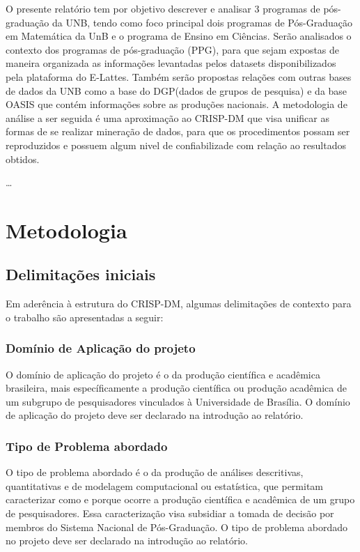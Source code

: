 \documentclass[]{article}
\begin{document}
O presente relatório tem por objetivo descrever e analisar 3 programas
de pós-graduação da UNB, tendo como foco principal dois programas de
Pós-Graduação em Matemática da UnB e o programa de Ensino em Ciências.
Serão analisados o contexto dos programas de pós-graduação (PPG), para
que sejam expostas de maneira organizada as informações levantadas pelos
datasets disponibilizados pela plataforma do E-Lattes. Também serão
propostas relações com outras bases de dados da UNB como a base do
DGP(dados de grupos de pesquisa) e da base OASIS que contém informações
sobre as produções nacionais. A metodologia de análise a ser seguida é
uma aproximação ao CRISP-DM que visa unificar as formas de se realizar
mineração de dados, para que os procedimentos possam ser reproduzidos e
possuem algum nivel de confiabilizade com relação ao resultados obtidos.

\ldots{}

\section{Metodologia}\label{metodologia}

\subsection{Delimitações iniciais}\label{delimitacoes-iniciais}

Em aderência à estrutura do CRISP-DM, algumas delimitações de contexto
para o trabalho são apresentadas a seguir:

\subsubsection{Domínio de Aplicação do
projeto}\label{dominio-de-aplicacao-do-projeto}

O domínio de aplicação do projeto é o da produção científica e acadêmica
brasileira, mais específicamente a produção científica ou produção
acadêmica de um subgrupo de pesquisadores vinculados à Universidade de
Brasília. O domínio de aplicação do projeto deve ser declarado na
introdução ao relatório.

\subsubsection{Tipo de Problema
abordado}\label{tipo-de-problema-abordado}

O tipo de problema abordado é o da produção de análises descritivas,
quantitativas e de modelagem computacional ou estatística, que permitam
caracterizar como e porque ocorre a produção científica e acadêmica de
um grupo de pesquisadores. Essa caracterização visa subsidiar a tomada
de decisão por membros do Sistema Nacional de Pós-Graduação. O tipo de
problema abordado no projeto deve ser declarado na introdução ao
relatório.
\end{document}
